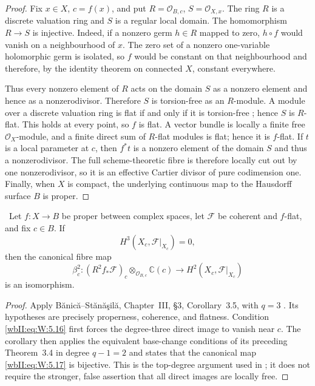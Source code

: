 \begin{proof}
Fix $x\in X$, $c=f(x)$, and put
$R=\mathcal O_{B,c}$, $S=\mathcal O_{X,x}$.  The ring $R$ is a discrete
valuation ring and $S$ is a regular local domain.  The homomorphism
$R\to S$ is injective.  Indeed, if a nonzero germ $h\in R$ mapped to zero,
$h\circ f$ would vanish on a neighbourhood of $x$.  The zero set of a
nonzero one-variable holomorphic germ is isolated, so $f$ would be constant
on that neighbourhood and therefore, by the identity theorem on connected
$X$, constant everywhere.

Thus every nonzero element of $R$ acts on the domain $S$ as a nonzero
element and hence as a nonzerodivisor.  Therefore $S$ is torsion-free as an
$R$-module.  A module over a discrete valuation ring is flat if and only if
it is torsion-free \cite[Tag~0AUW]{StacksProject}; hence $S$ is $R$-flat.
This holds at every point, so $f$ is flat.  A vector bundle is locally a
finite free $\mathcal O_X$-module, and a finite direct sum of $R$-flat
modules is flat; hence it is $f$-flat.  If $t$ is a local parameter at
$c$, then $f^*t$ is a nonzero element of the domain $S$ and thus a
nonzerodivisor.  The full scheme-theoretic fibre is therefore locally cut
out by one nonzerodivisor, so it is an effective Cartier divisor of pure
codimension one.  Finally, when $X$ is compact, the underlying continuous
map to the Hausdorff surface $B$ is proper.
\end{proof}

\begin{proposition}
\label{wbII:prop:analytic-base-change}
\ Let $f:X\to B$ be proper between complex spaces, let
$\mathcal F$ be coherent and $f$-flat, and fix $c\in B$.  If
\[
H^3(X_c,\mathcal F|_{X_c})=0,
\tag{W.13}\label{wbII:eq:W:5.16}
\]
then the canonical fibre map
\[
\beta_c^2:
(R^2f_*\mathcal F)_c\otimes_{\mathcal O_{B,c}}\mathbb C(c)
\longrightarrow H^2(X_c,\mathcal F|_{X_c})
\tag{W.14}\label{wbII:eq:W:5.17}
\]
is an isomorphism.
\end{proposition}

\begin{proof}
Apply B\u{a}nic\u{a}--St\u{a}n\u{a}\c{s}il\u{a},
Chapter~III, \S3, Corollary~3.5, with $q=3$
\cite[pp.~120--121]{BS76push}.  Its hypotheses are precisely
properness, coherence, and flatness.  Condition \eqref{wbII:eq:W:5.16} first forces the
degree-three direct image to vanish near $c$.  The corollary then applies the
equivalent base-change conditions of its preceding Theorem~3.4 in degree
$q-1=2$ and states that the canonical map \eqref{wbII:eq:W:5.17} is bijective.  This is the
top-degree argument used in \cite[Lemma~1.5]{CDP98}; it does not require
the stronger, false assertion that all direct images are locally free.
\end{proof}

